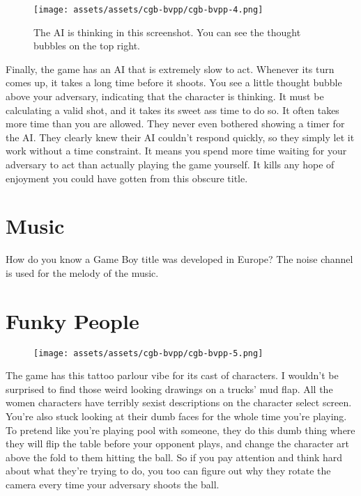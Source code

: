 \documentclass{book}
\begin{document}
\begin{figure}[hbt]
\vskip 10pt
\centering \texttt{[image: assets/assets/cgb-bvpp/cgb-bvpp-4.png]}\par\pagetwodescription The AI is thinking in this screenshot. You can see the thought bubbles on the top right.
\vskip 6pt
\end{figure}
Finally, the game has an AI that is extremely slow to act. Whenever its turn comes up, it takes a long time before it shoots. You see a little thought bubble above your adversary, indicating that the character is thinking. It must be calculating a valid shot, and it takes its sweet ass time to do so. It often takes more time than you are allowed. They never even bothered showing a timer for the AI. They clearly knew their AI couldn’t respond quickly, so they simply let it work without a time constraint. It means you spend more time waiting for your adversary to act than actually playing the game yourself. It kills any hope of enjoyment you could have gotten from this obscure title.

\FloatBarrier\needspace{5pt}\section*{Music}\nopagebreak[4]

How do you know a Game Boy title was developed in Europe? The noise channel is used for the melody of the music.

\FloatBarrier\needspace{5pt}\section*{Funky People}\nopagebreak[4]

\begin{figure}[hbt]
\vskip 10pt
\centering \texttt{[image: assets/assets/cgb-bvpp/cgb-bvpp-5.png]}
\vskip 6pt
\end{figure}
The game has this tattoo parlour vibe for its cast of characters. I wouldn’t be surprised to find those weird looking drawings on a trucks’ mud flap. All the women characters have terribly sexist descriptions on the character select screen. You’re also stuck looking at their dumb faces for the whole time you’re playing. To pretend like you’re playing pool with someone, they do this dumb thing where they will flip the table before your opponent plays, and change the character art above the fold to them hitting the ball. So if you pay attention and think hard about what they’re trying to do, you too can figure out why they rotate the camera every time your adversary shoots the ball.
\end{document}

